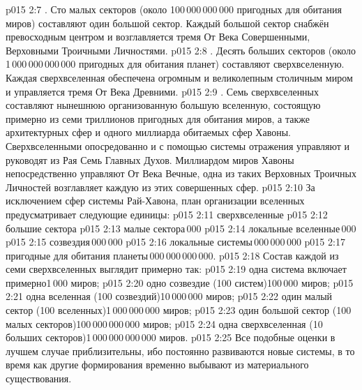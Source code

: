 \vs p015 2:7 . Сто малых секторов (около 100\,000\,000\,000 пригодных для обитания миров) составляют один большой сектор. Каждый большой сектор снабжён превосходным центром и возглавляется тремя От Века Совершенными, Верховными Троичными Личностями.
\vs p015 2:8 . Десять больших секторов (около 1\,000\,000\,000\,000 пригодных для обитания планет) составляют сверхвселенную. Каждая сверхвселенная обеспечена огромным и великолепным столичным миром и управляется тремя От Века Древними.
\vs p015 2:9 . Семь сверхвселенных составляют нынешнюю организованную большую вселенную, состоящую примерно из семи триллионов пригодных для обитания миров, а также архитектурных сфер и одного миллиарда обитаемых сфер Хавоны. Сверхвселенными опосредованно и с помощью системы отражения управляют и руководят из Рая Семь Главных Духов. Миллиардом миров Хавоны непосредственно управляют От Века Вечные, одна из таких Верховных Троичных Личностей возглавляет каждую из этих совершенных сфер.
\vs p015 2:10 \pc За исключением сфер системы Рай\hyp{}Хавона, план организации вселенных предусматривает следующие единицы:
\vs p015 2:11 сверхвселенные
\vs p015 2:12 большие сектора
\vs p015 2:13 малые сектора\,000
\vs p015 2:14 локальные вселенные\,000
\vs p015 2:15 созвездия\,000\,000
\vs p015 2:16 локальные системы\,000\,000\,000
\vs p015 2:17 пригодные для обитания планеты\,000\,000\,000\,000.
\vs p015 2:18 Состав каждой из семи сверхвселенных выглядит примерно так:
\vs p015 2:19 одна система включает примерно\hfill1\,000 миров;
\vs p015 2:20 одно созвездие (100 систем)\hfill100\,000 миров;
\vs p015 2:21 одна вселенная (100 созвездий)\hfill10\,000\,000 миров;
\vs p015 2:22 один малый сектор (100 вселенных)\hfill1\,000\,000\,000 миров;
\vs p015 2:23 один большой сектор (100 малых секторов)\hfill100\,000\,000\,000 миров;
\vs p015 2:24 одна сверхвселенная (10 больших секторов)\hfill1\,000\,000\,000\,000 миров.
\vs p015 2:25 \pc Все подобные оценки в лучшем случае приблизительны, ибо постоянно развиваются новые системы, в то время как другие формирования временно выбывают из материального существования.
